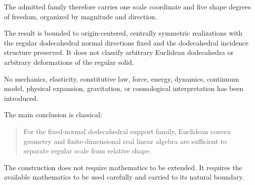 The admitted family therefore carries one scale coordinate and five shape
degrees of freedom, organized by magnitude and direction.

The result is bounded to origin-centered, centrally symmetric realizations
with the regular dodecahedral normal directions fixed and the dodecahedral
incidence structure preserved. It does not classify arbitrary Euclidean
dodecahedra or arbitrary deformations of the regular solid.

No mechanics, elasticity, constitutive law, force, energy, dynamics,
continuum model, physical expansion, gravitation, or cosmological
interpretation has been introduced.

The main conclusion is classical:

\begin{quote}
For the fixed-normal dodecahedral support family, Euclidean convex geometry
and finite-dimensional real linear algebra are sufficient to separate
regular scale from relative shape.
\end{quote}

The construction does not require mathematics to be extended. It requires
the available mathematics to be used carefully and carried to its natural
boundary.
